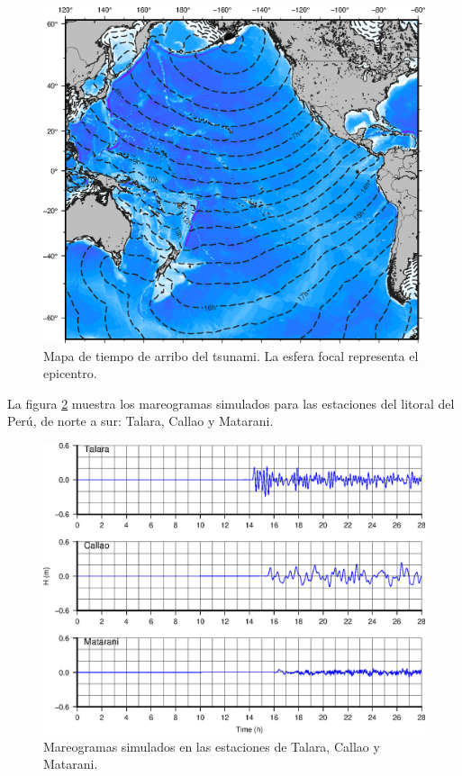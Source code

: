 \documentclass[a4paper,11pt,twocolumn]{article}
\begin{document}
\begin{figure}[H]
  \centering
  \includegraphics[width=\linewidth]{ttt.eps}
  \caption{Mapa de tiempo de arribo del tsunami. La esfera focal representa el epicentro.}
  \label{fig:ttt}
\end{figure}

La figura \ref{fig:mareogramas} muestra los mareogramas simulados para las estaciones del litoral del Perú, de norte a sur: Talara, Callao y Matarani.

\begin{figure}[H]
  \centering
  \includegraphics[width=\linewidth]{mareograma.eps}
  \caption{Mareogramas simulados en las estaciones de Talara, Callao y Matarani.}
  \label{fig:mareogramas}
\end{figure}
\end{document}
